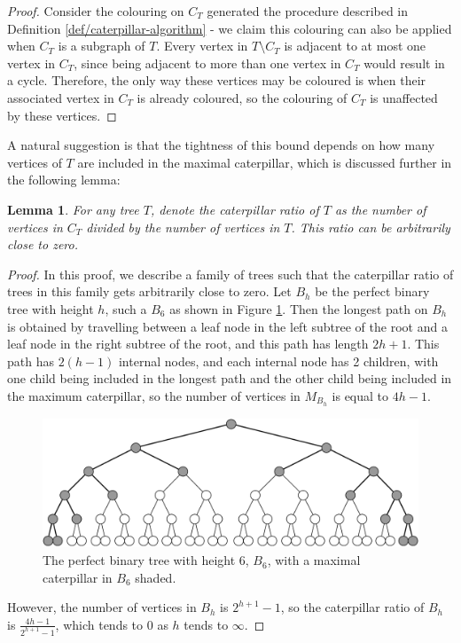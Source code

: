 \documentclass{mpaper}
\newtheorem{lemma}[theorem]{Lemma}
\begin{document}
\begin{proof}
  Consider the colouring on $C_T$ generated the procedure described in Definition \ref{def/caterpillar-algorithm} - we claim this colouring can also be applied when $C_T$ is a subgraph of $T$. Every vertex in $T \setminus C_T$ is adjacent to at most one vertex in $C_T$, since being adjacent to more than one vertex in $C_T$ would result in a cycle. Therefore, the only way these vertices may be coloured is when their associated vertex in $C_T$ is already coloured, so the colouring of $C_T$ is unaffected by these vertices.
\end{proof}

A natural suggestion is that the tightness of this bound depends on how many vertices of $T$ are included in the maximal caterpillar, which is discussed further in the following lemma:

\begin{lemma}
  \label{lem/ratio-tends-to-zero}
  For any tree $T$, denote the \emph{caterpillar ratio of $T$} as the number of vertices in $C_T$ divided by the number of vertices in $T$. This ratio can be arbitrarily close to zero.
\end{lemma}

\begin{proof}

In this proof, we describe a family of trees such that the caterpillar ratio of trees in this family gets arbitrarily close to zero.
Let $B_h$ be the perfect binary tree with height $h$, such a $B_6$ as shown in Figure \ref{fig/binary-tree}. Then the longest path on $B_h$ is obtained by travelling between a leaf node in the left subtree of the root and a leaf node in the right subtree of the root, and this path has length $2h+1$. This path has $2(h-1)$ internal nodes, and each internal node has 2 children, with one child being included in the longest path and the other child being included in the maximum caterpillar, so the number of vertices in $M_{B_h}$ is equal to $4h-1$.

\begin{figure}
    \centering
    \includegraphics[scale=0.45]{mpaper/figures/BinaryTree.pdf}
    \caption{The perfect binary tree with height $6$, $B_6$, with a maximal caterpillar in $B_6$ shaded.}
    \label{fig/binary-tree}
\end{figure}

However, the number of vertices in $B_h$ is $2^{h+1}-1$, so the caterpillar ratio of $B_h$ is $\frac{4h-1}{2^{h+1}-1}$, which tends to $0$ as $h$ tends to $\infty$.
\end{proof}
\end{document}
